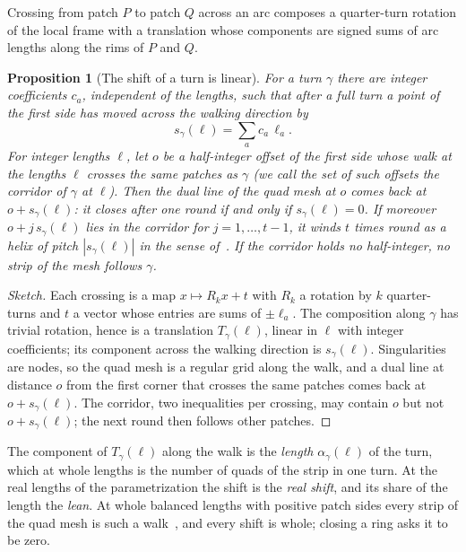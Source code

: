 \documentclass[11pt,a4paper]{article}
\newtheorem{proposition}{Proposition}
\newcommand{\shift}{s}
\begin{document}
Crossing from patch $P$ to patch $Q$ across an arc composes a quarter-turn
rotation of the local frame with a translation whose components are signed
sums of arc lengths along the rims of $P$ and $Q$.

\begin{proposition}[The shift of a turn is linear]\label{prop:linear}
For a turn $\gamma$ there are integer coefficients $c_a$, independent of the
lengths, such that after a full turn a point of the first side has moved
across the walking direction by
\[
  \shift_\gamma(\ell) = \sum_a c_a\, \ell_a .
\]
For integer lengths $\ell$, let $o$ be a half-integer offset of the first side
whose walk at the lengths $\ell$ crosses the same patches as $\gamma$ (we call
the set of such offsets the \emph{corridor} of $\gamma$ at $\ell$). Then the
dual line of the quad mesh at $o$ comes back at $o + \shift_\gamma(\ell)$: it
closes after one round if and only if $\shift_\gamma(\ell) = 0$. If moreover
$o + j\,\shift_\gamma(\ell)$ lies in the corridor for $j = 1, \dots, t - 1$, it
winds $t$ times round as a helix of pitch $|\shift_\gamma(\ell)|$ in the sense
of~\cite{bommes2011structure}. If the corridor holds no half-integer, no strip
of the mesh follows $\gamma$.
\end{proposition}

\begin{proof}[Sketch]
Each crossing is a map $x \mapsto R_k x + t$ with $R_k$ a rotation by $k$
quarter-turns and $t$ a vector whose entries are sums of $\pm\ell_a$. The
composition along $\gamma$ has trivial rotation, hence is a translation
$T_\gamma(\ell)$, linear in $\ell$ with integer coefficients; its component
across the walking direction is $\shift_\gamma(\ell)$. Singularities are
nodes, so the quad mesh is a regular grid along the walk, and a dual line at
distance $o$ from the first corner that crosses the same patches comes back at
$o + \shift_\gamma(\ell)$. The corridor, two inequalities per crossing, may
contain $o$ but not $o + \shift_\gamma(\ell)$; the next round then follows
other patches.
\end{proof}

The component of $T_\gamma(\ell)$ along the walk is the \emph{length}
$\alpha_\gamma(\ell)$ of the turn, which at whole lengths is the number of
quads of the strip in one turn. At the real lengths of the parametrization the
shift is the \emph{real shift}, and its share of the length the \emph{lean}.
At whole balanced lengths with positive patch sides every strip of the quad
mesh is such a walk~\cite[Prop.~2]{gardent2026loops}, and every shift is
whole; closing a ring asks it to be zero.
\end{document}
